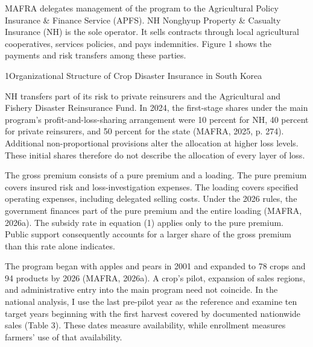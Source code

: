 

MAFRA delegates management of the program to the Agricultural Policy Insurance \& Finance Service (APFS). NH Nonghyup Property \& Casualty Insurance (NH) is the sole operator. It sells contracts through local agricultural cooperatives, services policies, and pays indemnities. Figure 1 shows the payments and risk transfers among these parties.

\begin{wordfigure}{1}{Organizational Structure of Crop Disaster Insurance in South Korea}
\end{wordfigure}

NH transfers part of its risk to private reinsurers and the Agricultural and Fishery Disaster Reinsurance Fund. In 2024, the first-stage shares under the main program's profit-and-loss-sharing arrangement were 10 percent for NH, 40 percent for private reinsurers, and 50 percent for the state (MAFRA, 2025, p. 274). Additional non-proportional provisions alter the allocation at higher loss levels. These initial shares therefore do not describe the allocation of every layer of loss.

The gross premium consists of a pure premium and a loading. The pure premium covers insured risk and loss-investigation expenses. The loading covers specified operating expenses, including delegated selling costs. Under the 2026 rules, the government finances part of the pure premium and the entire loading (MAFRA, 2026a). The subsidy rate in equation (1) applies only to the pure premium. Public support consequently accounts for a larger share of the gross premium than this rate alone indicates.


The program began with apples and pears in 2001 and expanded to 78 crops and 94 products by 2026 (MAFRA, 2026a). A crop's pilot, expansion of sales regions, and administrative entry into the main program need not coincide. In the national analysis, I use the last pre-pilot year as the reference and examine ten target years beginning with the first harvest covered by documented nationwide sales (Table 3). These dates measure availability, while enrollment measures farmers' use of that availability.

